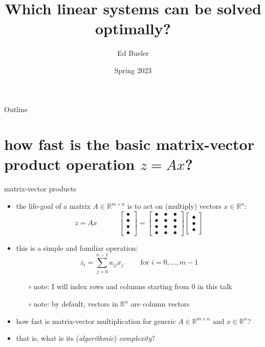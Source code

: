 \documentclass[10pt,
               svgnames,
               hyperref={colorlinks,citecolor=DeepPink4,linkcolor=FireBrick,urlcolor=Maroon},
               usepdftitle=false]{beamer}
\title{Which linear systems can be solved optimally?}
\author{Ed Bueler}
\institute[]{UAF Math 692 Scalable Seminar}
\date{Spring 2023}
\newcommand{\RR}{\mathbb{R}}
\begin{document}
\beamertemplatenavigationsymbolsempty

\begin{frame}
  \maketitle
\end{frame}

\begin{frame}{Outline}
  \tableofcontents[hideallsubsections]
\end{frame}

\section{how fast is the basic matrix-vector product operation $z=Ax$?}

\newcommand{\bulletax}{\begin{bmatrix} \bullet \\ \bullet \\ \bullet \\ \bullet \end{bmatrix} = \begin{bmatrix} \bullet & \bullet & \bullet \\ \bullet & \bullet & \bullet \\ \bullet & \bullet & \bullet \\ \bullet & \bullet & \bullet \end{bmatrix} \begin{bmatrix} \bullet \\ \bullet \\ \bullet \end{bmatrix}}

\begin{frame}{matrix-vector products}
\begin{itemize}
\item the life-goal of a matrix $A \in \RR^{m\times n}$ is to act on (multiply) vectors $x \in \RR^n$:
    $$z = Ax \qquad\quad \bulletax$$
\item this is a simple and familiar operation:
    $$z_i = \sum_{j=0}^{n-1} a_{ij} x_j \qquad \text{ for } i=0,\dots,m-1$$

    \begin{itemize}
    \item[$\circ$] note: I will index rows and columns starting from 0 in this talk
    \item[$\circ$] note: by default, vectors in $\RR^n$ are column vectors
    \end{itemize}

\medskip
\item how fast is matrix-vector multiplication for generic $A \in \RR^{m\times n}$ and $x \in \RR^n$?

\medskip
\item that is, what is its (\emph{algorithmic}) \emph{complexity}?
\end{itemize}
\end{frame}
\end{document}
